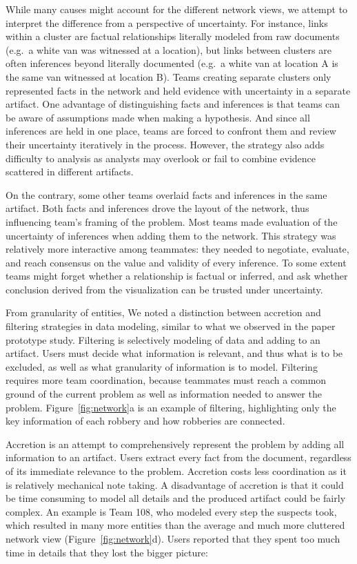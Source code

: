 While many causes might account for the different network views, we
attempt to interpret the difference from a perspective of uncertainty.
For instance, links within a cluster are factual relationships literally
modeled from raw documents (e.g.~a white van was witnessed at a
location), but links between clusters are often inferences beyond
literally documented (e.g.~a white van at location A is the same van
witnessed at location B). Teams creating separate clusters only
represented facts in the network and held evidence with uncertainty in a
separate artifact. One advantage of distinguishing facts and inferences
is that teams can be aware of assumptions made when making a hypothesis.
And since all inferences are held in one place, teams are forced to
confront them and review their uncertainty iteratively in the process.
However, the strategy also adds difficulty to analysis as analysts may
overlook or fail to combine evidence scattered in different artifacts.

On the contrary, some other teams overlaid facts and inferences in the
same artifact. Both facts and inferences drove the layout of the
network, thus influencing team's framing of the problem. Most teams made
evaluation of the uncertainty of inferences when adding them to the
network. This strategy was relatively more interactive among teammates:
they needed to negotiate, evaluate, and reach consensus on the value and
validity of every inference. To some extent teams might forget whether a
relationship is factual or inferred, and ask whether conclusion derived
from the visualization can be trusted under uncertainty.

From granularity of entities, We noted a distinction between accretion
and filtering strategies in data modeling, similar to what we observed
in the paper prototype study. Filtering is selectively modeling of data
and adding to an artifact. Users must decide what information is
relevant, and thus what is to be excluded, as well as what granularity
of information is to model. Filtering requires more team coordination,
because teammates must reach a common ground of the current problem as
well as information needed to answer the problem. Figure~\ref{fig:network}a is an example of filtering, highlighting only
the key information of each robbery and how robberies are connected.

Accretion is an attempt to comprehensively represent the problem by
adding all information to an artifact. Users extract every fact from the
document, regardless of its immediate relevance to the problem.
Accretion costs less coordination as it is relatively mechanical note
taking. A disadvantage of accretion is that it could be time consuming
to model all details and the produced artifact could be fairly complex.
An example is Team 108, who modeled every step the suspects took, which
resulted in many more entities than the average and much more cluttered
network view (Figure~\ref{fig:network}d). Users reported that they
spent too much time in details that they lost the bigger picture:

